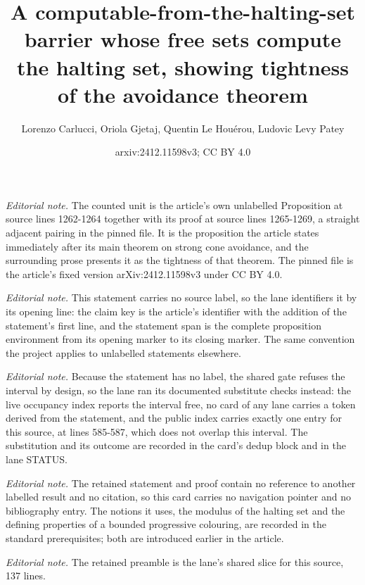 \documentclass{article}
\title{A computable-from-the-halting-set barrier whose free sets compute the halting set, showing tightness of the avoidance theorem}
\author{Lorenzo Carlucci, Oriola Gjetaj, Quentin Le Houérou, Ludovic Levy Patey}
\date{arxiv:2412.11598v3; CC BY 4.0}
\begin{document}
\maketitle
\noindent\textit{Editorial note.} The counted unit is the article's own unlabelled Proposition at source lines 1262-1264 together with its proof at source lines 1265-1269, a straight adjacent pairing in the pinned file. It is the proposition the article states immediately after its main theorem on strong cone avoidance, and the surrounding prose presents it as the tightness of that theorem. The pinned file is the article's fixed version arXiv:2412.11598v3 under CC BY 4.0.\par\medskip
\noindent\textit{Editorial note.} This statement carries no source label, so the lane identifiers it by its opening line: the claim key is the article's identifier with the addition of the statement's first line, and the statement span is the complete proposition environment from its opening marker to its closing marker. The same convention the project applies to unlabelled statements elsewhere.\par\medskip
\noindent\textit{Editorial note.} Because the statement has no label, the shared gate refuses the interval by design, so the lane ran its documented substitute checks instead: the live occupancy index reports the interval free, no card of any lane carries a token derived from the statement, and the public index carries exactly one entry for this source, at lines 585-587, which does not overlap this interval. The substitution and its outcome are recorded in the card's dedup block and in the lane STATUS.\par\medskip
\noindent\textit{Editorial note.} The retained statement and proof contain no reference to another labelled result and no citation, so this card carries no navigation pointer and no bibliography entry. The notions it uses, the modulus of the halting set and the defining properties of a bounded progressive colouring, are recorded in the standard prerequisites; both are introduced earlier in the article.\par\medskip
\noindent\textit{Editorial note.} The retained preamble is the lane's shared slice for this source, 137 lines.\par\medskip
\end{document}
